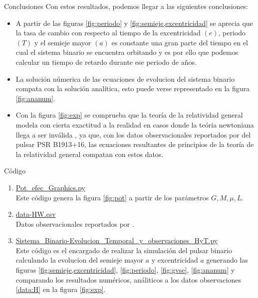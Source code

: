 \begin{frame}{Conclusiones}
    Con estos resultados, podemos llegar a las siguientes conclusiones:
\begin{itemize}
    \item A partir de las figuras \ref{fig:periodo} y \ref{fig:semieje,excentricidad} se aprecia que la tasa de cambio 
    con respecto al tiempo de la excentricidad $(e)$, periodo $(T)$ y el semieje mayor $(a)$ es constante una gran parte del 
    tiempo en el cual el sistema binario se encuentra orbitando y es por ello que podemos calcular un tiempo de retardo durante ese periodo de años.
    \item La solución númerica de las ecuaciones de evolucion del sistema binario compata con la solución analítica, esto puede verse representado
    en la figura \ref{fig:ananum}.
    \item Con la figura \ref{fig:exp} se comprueba que la teoría de la relatividad general modela con cierta exactitud a la realidad en casos donde la teória newtoniana llega a ser inválida
    , ya que, con los datos observacionales reportados por \cite{Weisberg2010} del pulsar PSR B1913+16, las ecuaciones resultantes de principios de la teoría de la relatividad general compatan con estos datos.
\end{itemize}
\end{frame}
\begin{frame}{Código}
    \begin{enumerate}
        \item \href{https://github.com/giovannilopez9808/Notas_Agosto_2020/blob/master/RG/Proyecto_final/Documento/Scripts/Pot_efec_Graphics.py}{Pot\_efec\_Graphics.py\label{cod:potefe}}\\
        Este código genera la figura \ref{fig:pot} a partir de los parámetros $G,M,\mu,L$.
        \item \href{https://github.com/giovannilopez9808/Notas_Agosto_2020/blob/master/RG/Proyecto_final/Documento/Scripts/data-HW.csv}{data-HW.csv\label{data:H}}\\
        Datos observacionales reportados por \cite{Weisberg2010}.
        \item \href{https://github.com/giovannilopez9808/Notas_Agosto_2020/blob/master/RG/Proyecto_final/Documento/Scripts/Sistema_Binario-Evolucion_Temporal_y_observaciones_HyT.py}{Sistema\_Binario-Evolucion\_Temporal\_y\_observaciones\_HyT.py\label{cod:evo}}\\
        Este código es el encargado de realizar la simulación del pulsar binario calculando la evolucion del semieje mayor $a$ y excentricidad $a$ generando las figuras \ref{fig:semieje,excentricidad}, \ref{fig:periodo}, \ref{fig:gvse}, \ref{fig:ananum} y comparando los resultados numéricos, análiticos a los datos observaciones 
        \ref{data:H} en la figura \ref{fig:exp}.
    \end{enumerate}
\end{frame}